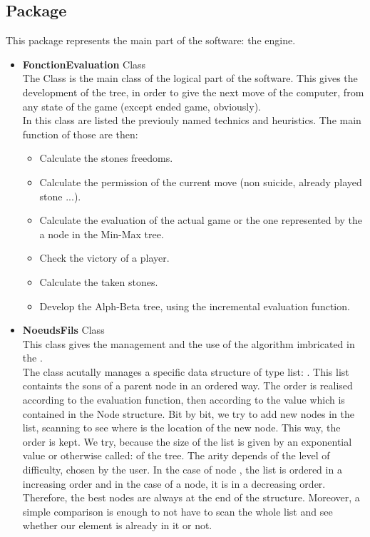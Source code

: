 \documentclass[a4paper,10pt]{report}
\newcommand{\empha}[1]{\textbf{\color{blue}{#1}}}
\begin{document}
			\subsection{Package \empha{logic}}
This package represents the main part of the software: the \empha{Artificial Inteligence} engine.
			\begin{itemize}
				\item \textbf{FonctionEvaluation} Class\\
The \empha{FonctionEvaluation} Class is the main class of the logical part of the software. This gives the development of the \empha{Min-Max} tree, in order to give the next move of the computer, from any state of the game (except ended game, obviously).
\\
In this class are listed the previouly named technics and heuristics. The main function of those are then:
			\begin{itemize}
				\item Calculate the stones freedoms.
				\item Calculate the permission of the current move (non suicide, already played stone ...).
				\item Calculate the evaluation of the actual game or the one represented by the a node in the Min-Max tree.
				\item Check the victory of a player.
				\item Calculate the taken stones.
				\item Develop the Alph-Beta tree, using the incremental evaluation function.
			
			\end{itemize}

				\item \textbf{NoeudsFils} Class \\
This class gives the management and the use of the \empha{$A^*$} algorithm imbricated in the \empha{Min-Max}.
\\
The class acutally manages a specific data structure of type list: \empha{ArrayList}. This list containts the sons of a parent node in an ordered way. The order is realised according to the evaluation function, then according to the value which is contained in the Node structure. Bit by bit, we try to add new nodes in the list, scanning to see where is the location of the new node. This way, the order is kept. We try, because the size of the list is given by an exponential value or otherwise called: \empha{Arity} of the tree. The arity depends of the level of difficulty, chosen by the user. In the case of node \empha{max}, the list is ordered in a increasing order and in the case of a \empha{min} node, it is in a decreasing order. Therefore, the best nodes are always at the end of the structure. Moreover, a simple comparison is enough to not have to scan the whole list and see whether our element is already in it or not.


\end{itemize}
\end{document}
